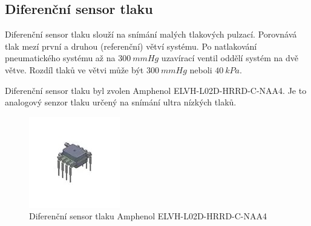 \subsection{Diferenční sensor tlaku} \label{section:diff_pressure_sen}
Diferenční sensor tlaku slouží na snímání malých tlakových pulzací. Porovnává tlak mezí první a druhou (referenční) větví systému. Po natlakování pneumatického systému až na $300 \ mmHg$ uzavírací ventil oddělí systém na dvě větve. Rozdíl tlaků ve větvi může být $300 \ mmHg$ neboli $40 \ kPa$. \par
Diferenční sensor tlaku byl zvolen Amphenol ELVH-L02D-HRRD-C-NAA4. Je to analogový senzor tlaku určený na snímání ultra nízkých tlaků.
\begin{figure}[H]
    \centering
    \includegraphics[width=0.3\linewidth]{pictures/amphenol.jpg}
    \caption{Diferenční sensor tlaku Amphenol ELVH-L02D-HRRD-C-NAA4}
    \label{fig:amphenol}
\end{figure}


